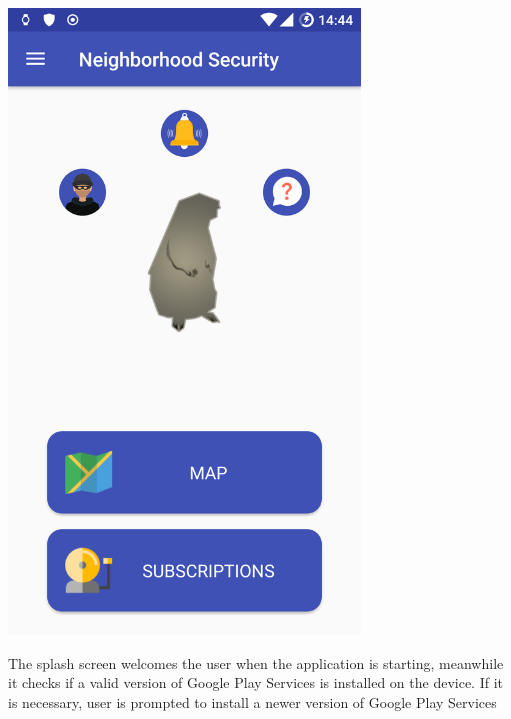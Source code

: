 \documentclass[a4paper]{scrreprt}
\begin{document}
\begin{minipage}{0.5\textwidth}
	\centering
	\includegraphics[width=0.7\textwidth]{home}
\end{minipage}
\begin{minipage}{0.5\textwidth}
	The splash screen welcomes the user when the application is starting, meanwhile it checks if a valid version of Google Play Services is installed on the device. If it is necessary, user is prompted to install a newer version of Google Play Services
\end{minipage}
\end{document}
